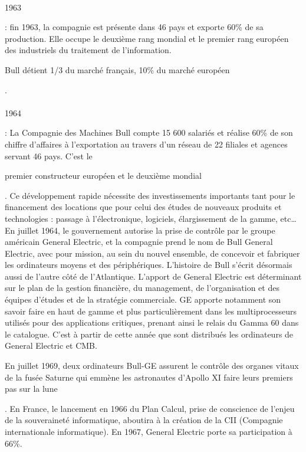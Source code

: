 \documentclass[11pt]{article}
\begin{document}
		\paragraph{}
		\begin{bf}1963\end{bf}: fin 1963, la compagnie est présente dans 46 pays et exporte 60\% de sa production. Elle 
		occupe le deuxième rang mondial et le premier rang européen des industriels du traitement de l’information. \begin{bf}Bull 
		détient 1/3 du marché français, 10\% du marché européen\end{bf}.
		\paragraph{}
		\begin{bf}1964\end{bf}: La Compagnie des Machines Bull compte 15 600 salariés et réalise 60\% de son chiffre 
		d’affaires à l’exportation au travers d’un réseau de 22 filiales et agences servant 46 pays. C’est le \begin{bf}premier 
		constructeur européen et le deuxième mondial\end{bf}. Ce développement rapide nécessite des investissements importants 
		tant pour le financement des locations que pour celui des études de nouveaux produits et technologies : passage à 
		l’électronique, logiciels, élargissement de la gamme, etc…\newline{}
		En juillet 1964, le gouvernement autorise la prise de contrôle par le groupe américain General Electric, et la 
		compagnie prend le nom de Bull General Electric, avec pour mission, au sein du nouvel ensemble, de concevoir et 
		fabriquer les ordinateurs moyens et des périphériques.\newline{}
		L’histoire de Bull s’écrit désormais aussi de l’autre côté de l’Atlantique. L’apport de General Electric est 
		déterminant sur le plan de la gestion financière, du management, de l’organisation et des équipes d’études et de la 
		stratégie commerciale. GE apporte notamment son savoir faire en haut de gamme et plus particulièrement dans les 
		multiprocesseurs utilisés pour des applications critiques, prenant ainsi le relais du Gamma 60 dans le catalogue. 
		C’est à partir de cette année que sont distribués les ordinateurs de General Electric et CMB. \begin{bf}En juillet 1969, deux 
		ordinateurs Bull-GE assurent le contrôle des organes vitaux de la fusée Saturne qui emmène les astronautes d’Apollo XI 
		faire leurs premiers pas sur la lune\end{bf}. En France, le lancement en 1966 du Plan Calcul, prise de conscience de l’enjeu 
		de la souveraineté informatique, aboutira à la création de la CII (Compagnie internationale informatique). En 1967, 
		General Electric porte sa participation à 66\%.
\end{document}

